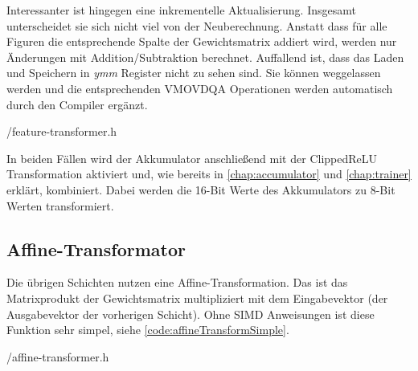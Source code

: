 Interessanter ist hingegen eine inkrementelle Aktualisierung. Insgesamt unterscheidet sie sich nicht viel von der Neuberechnung. Anstatt dass für alle Figuren die entsprechende Spalte der Gewichtsmatrix addiert wird, werden nur Änderungen mit Addition/Subtraktion berechnet. Auffallend ist, dass das Laden und Speichern in \emph{ymm} Register nicht zu sehen sind. Sie können weggelassen werden und die entsprechenden VMOVDQA Operationen werden automatisch durch den Compiler ergänzt.


{\srcloc/feature-transformer.h}

In beiden Fällen wird der Akkumulator anschließend mit der Clipped\ac{ReLU} Transformation aktiviert und, wie bereits in \autoref{chap:accumulator} und \autoref{chap:trainer} erklärt, kombiniert. Dabei werden die 16-Bit Werte des Akkumulators zu 8-Bit Werten transformiert.

% 

\subsection{Affine-Transformator}

Die übrigen Schichten nutzen eine Affine-Transformation. Das ist das Matrixprodukt der Gewichtsmatrix multipliziert mit dem Eingabevektor (der Ausgabevektor der vorherigen Schicht). Ohne \ac{SIMD} Anweisungen ist diese Funktion sehr simpel, siehe \autoref{code:affineTransformSimple}. 


{\srcloc/affine-transformer.h}

